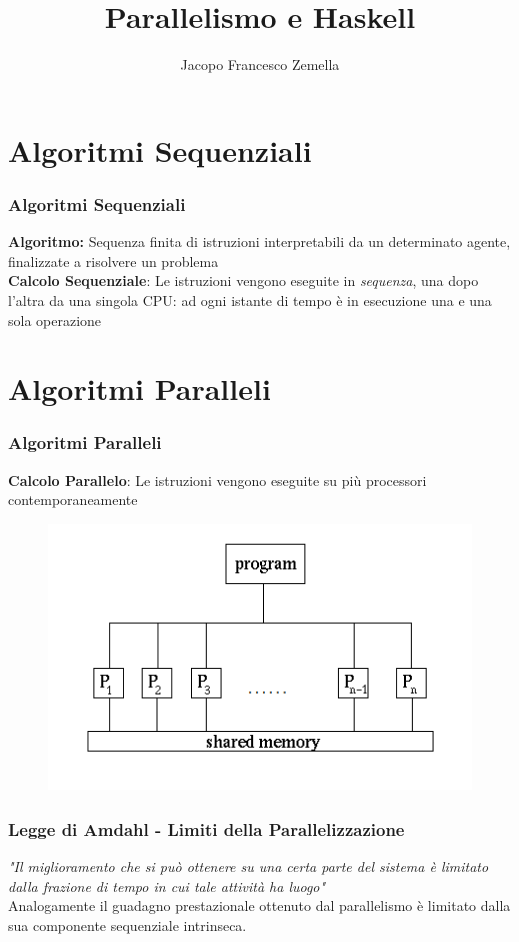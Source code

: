 \documentclass[14pt]{beamer}
\title[Parallelismo e Haskell]{Parallelismo e Haskell} %
\author{Jacopo Francesco Zemella} %
\institute[Unimi] %
{
Università degli studi di Milano \\[2ex] %
\medskip
\textit{jacopofrancesco.zemella@studenti.unimi.it} %
}
\begin{document}
\begin{frame}
\titlepage
\end{frame}


\section{Algoritmi Sequenziali} 


\begin{frame}
\frametitle{Algoritmi Sequenziali}
\textbf{Algoritmo:} Sequenza finita di istruzioni interpretabili da un determinato agente, finalizzate a risolvere un problema\\[2ex]
\textbf{Calcolo Sequenziale}: Le istruzioni vengono eseguite in \textit{sequenza}, una dopo l'altra da una singola CPU: ad ogni istante di tempo è in esecuzione una e una sola operazione
\end{frame}


\section{Algoritmi Paralleli} 
\frame
{
	\frametitle{Algoritmi Paralleli}
	\textbf{Calcolo Parallelo}: Le istruzioni vengono eseguite su più processori contemporaneamente\\[2ex]
  \begin{figure}
    \centering
    \includegraphics[width=8 cm]{./pram}
  \end{figure}

}


\begin{frame}
\frametitle{Legge di Amdahl - Limiti della Parallelizzazione}
\textit{"Il miglioramento che si può ottenere su una certa parte del sistema è limitato dalla frazione di tempo in cui tale attività ha luogo"}\\[2ex]
Analogamente il guadagno prestazionale ottenuto dal parallelismo è limitato dalla sua componente sequenziale intrinseca.
\end{frame}
\end{document}

